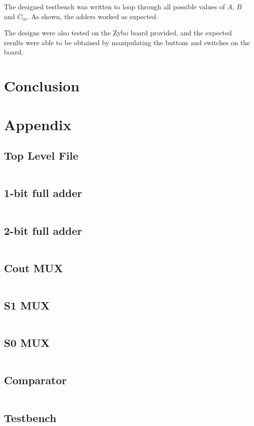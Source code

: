 \documentclass[12pt]{article}
\begin{document}
The designed testbench was written to loop through all possible values of $A$, $B$ and $C_{in}$.
As shown, the adders worked as expected.

The designs were also tested on the Zybo board provided, and the expected results were able to be obtained by manipulating the buttons and switches on the board.

\section{Conclusion}




\pagebreak
\section*{Appendix}

\subsection{Top Level File}
\inputminted{vhdl}{../src/lab1_top.vhd}

\pagebreak
\subsection{1-bit full adder}
\inputminted{vhdl}{../src/full_adder_1bit.vhd}

\pagebreak
\subsection{2-bit full adder}
\inputminted{vhdl}{../src/full_adder_2bit.vhd}

\pagebreak
\subsection{Cout MUX}
\inputminted{vhdl}{../src/Co_mux.vhd}

\pagebreak
\subsection{S1 MUX}
\inputminted{vhdl}{../src/S1_mux.vhd}

\pagebreak
\subsection{S0 MUX}
\inputminted{vhdl}{../src/S0_mux.vhd}

\pagebreak
\subsection{Comparator}
\inputminted{vhdl}{../src/comparator.vhd}

\pagebreak
\subsection{Testbench}
\inputminted{vhdl}{../test/full_adder_2bit_tb.vhd}

\renewcommand{\thepage}{}
\end{document}
